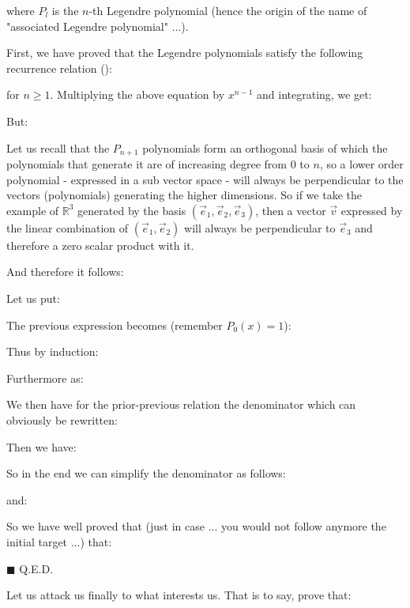 	where $P_l$ is the $n$-th Legendre polynomial (hence the origin of the name of "associated  Legendre polynomial" ...).
	\begin{dem}
	First, we have proved that the Legendre polynomials satisfy the following recurrence relation ():
	
	for $n\geq 1$.
	Multiplying the above equation by $x^{n-1}$ and integrating, we get:
	
	But:
	
	Let us recall that the $P_{n+1}$ polynomials form an orthogonal basis of which the polynomials that generate it are of increasing degree from $0$ to $n$, so a lower order polynomial - expressed in a sub vector space - will always be perpendicular to the vectors (polynomials) generating the higher dimensions. So if we take the example of $\mathbb{R}^3$ generated by the basis $(\vec{e}_1,\vec{e}_2,\vec{e}_3)$, then a vector $\vec{v}$ expressed by the linear combination of $(\vec{e}_1,\vec{e}_2)$ will always be perpendicular to $\vec{e}_3$ and therefore a zero scalar product with it.

	And  therefore it follows:
	
	Let us put:
	
	The previous expression becomes (remember $P_0(x)=1$):
	
	Thus by induction:
	
	Furthermore as:
	
	We then have for the prior-previous relation the denominator which can obviously be rewritten:
	
	Then we have:
	
	So in the end we can simplify the denominator as follows:
	
	and:
	
	So we have well proved that (just in case ... you would not follow anymore the initial target ...) that:
	
	\begin{flushright}
		$\blacksquare$  Q.E.D.
	\end{flushright}
	\end{dem}
	Let us attack us finally to what interests us. That is to say, prove that:
	
